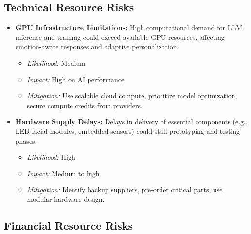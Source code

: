 \documentclass[
  letterpaper,
  DIV=11,
  numbers=noendperiod]{scrartcl}
\providecommand{\tightlist}{%
  \setlength{\itemsep}{0pt}\setlength{\parskip}{0pt}}\usepackage{longtable,booktabs,array}
\begin{document}
\subsection{Technical Resource Risks}\label{technical-resource-risks}

\begin{itemize}
\tightlist
\item
  \textbf{GPU Infrastructure Limitations:} High computational demand for
  LLM inference and training could exceed available GPU resources,
  affecting emotion-aware responses and adaptive personalization.

  \begin{itemize}
  \tightlist
  \item
    \emph{Likelihood:} Medium
  \item
    \emph{Impact:} High on AI performance
  \item
    \emph{Mitigation:} Use scalable cloud compute, prioritize model
    optimization, secure compute credits from providers.
  \end{itemize}
\item
  \textbf{Hardware Supply Delays:} Delays in delivery of essential
  components (e.g., LED facial modules, embedded sensors) could stall
  prototyping and testing phases.

  \begin{itemize}
  \tightlist
  \item
    \emph{Likelihood:} High
  \item
    \emph{Impact:} Medium to high
  \item
    \emph{Mitigation:} Identify backup suppliers, pre-order critical
    parts, use modular hardware design.
  \end{itemize}
\end{itemize}

\subsection{Financial Resource Risks}\label{financial-resource-risks}
\end{document}
